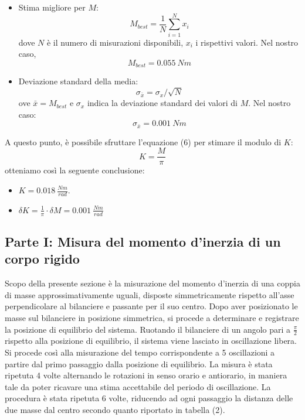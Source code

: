 \begin{itemize}
    \item Stima migliore per $M$:
    \begin{equation}
        M_{best} = \frac{1}{N}\sum_{i=1}^{N} x_i
    \end{equation}
    dove $N$ è il numero di misurazioni disponibili, $x_i$ i rispettivi valori. Nel nostro caso,
    \begin{equation}
        M_{best} = 0.055 \ Nm
    \end{equation}
    \item Deviazione standard della media:
    \begin{equation}
        \sigma_{\bar{x}} = \sigma_x/\sqrt{N}
    \end{equation}
    ove $\bar{x} = M_{best}$ e $\sigma_x$ indica la deviazione standard dei valori di $M$. Nel nostro caso:
    \begin{equation}
        \sigma_{\bar{x}} = 0.001 \ Nm
    \end{equation}
\end{itemize}
A questo punto, è possibile sfruttare l'equazione (6) per stimare il modulo di $K$:
\begin{equation}
    K = \frac{M}{\pi} 
\end{equation}
otteniamo così la seguente conclusione: 
\begin{itemize}
    \item $K = 0.018 \ \frac{Nm}{rad}$. 
    \item $\delta K = \frac{1}{\pi}\cdot \delta M = 0.001 \  \frac{Nm}{rad}$
\end{itemize}

\subsection{Parte I: Misura del momento d'inerzia di un corpo rigido}
Scopo della presente sezione è la misurazione del momento d'inerzia di una coppia di masse approssimativamente uguali, disposte simmetricamente rispetto all'asse perpendicolare al bilanciere e passante per il suo centro. Dopo aver posizionato le masse sul bilanciere in posizione simmetrica, si procede a determinare e registrare la posizione di equilibrio del sistema. Ruotando il bilanciere di un angolo pari a $\frac{\pi}{2}$ rispetto alla posizione di equilibrio, il sistema viene lasciato in oscillazione libera. Si procede così alla misurazione del tempo corrispondente a 5 oscillazioni a partire dal primo passaggio dalla posizione di equilibrio. La misura è stata ripetuta 4 volte alternando le rotazioni in senso orario e antiorario, in maniera tale da poter ricavare una stima accettabile del periodo di oscillazione. La procedura è stata ripetuta 6 volte, riducendo ad ogni passaggio la distanza delle due masse dal centro secondo quanto riportato in tabella (2).

